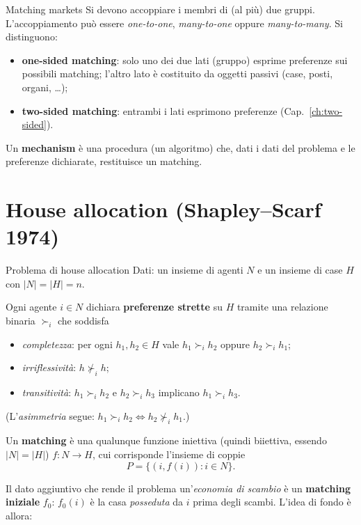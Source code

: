 \documentclass[12pt,a4paper,twoside]{book}
\theoremstyle{plain}
\theoremstyle{definition}
\begin{document}
\begin{defbox}{Matching markets}
Si devono accoppiare i membri di (al più) due gruppi. L'accoppiamento può essere \emph{one-to-one}, \emph{many-to-one} oppure \emph{many-to-many}. Si distinguono:
\begin{itemize}
  \item \textbf{one-sided matching}: solo uno dei due lati (gruppo) esprime preferenze sui possibili matching; l'altro lato è costituito da oggetti passivi (case, posti, organi, \dots);
  \item \textbf{two-sided matching}: entrambi i lati esprimono preferenze (Cap.~\ref{ch:two-sided}).
\end{itemize}
Un \textbf{mechanism} è una procedura (un algoritmo) che, dati i dati del problema e le preferenze dichiarate, restituisce un matching.
\end{defbox}

\section{House allocation (Shapley--Scarf 1974)}

\begin{defbox}{Problema di house allocation}
Dati: un insieme di agenti $N$ e un insieme di case $H$ con $|N|=|H|=n$.

Ogni agente $i\in N$ dichiara \textbf{preferenze strette} su $H$ tramite una relazione binaria $\succ_i$ che soddisfa
\begin{itemize}
  \item \emph{completezza}: per ogni $h_1,h_2\in H$ vale $h_1\succ_i h_2$ oppure $h_2\succ_i h_1$;
  \item \emph{irriflessività}: $h\not\succ_i h$;
  \item \emph{transitività}: $h_1\succ_i h_2$ e $h_2\succ_i h_3$ implicano $h_1\succ_i h_3$.
\end{itemize}
(L'\emph{asimmetria} segue: $h_1\succ_i h_2\iff h_2\not\succ_i h_1$.)

Un \textbf{matching} è una qualunque funzione iniettiva (quindi biiettiva, essendo $|N|=|H|$) $f:N\to H$, cui corrisponde l'insieme di coppie
\[ P=\bigl\{(i,f(i)) : i\in N\bigr\}. \]
\end{defbox}

Il dato aggiuntivo che rende il problema un'\emph{economia di scambio} è un \textbf{matching iniziale} $f_0$: $f_0(i)$ è la casa \emph{posseduta} da $i$ prima degli scambi. L'idea di fondo è allora:
\end{document}
